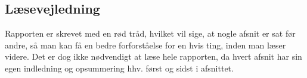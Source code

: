 \subsection{Læsevejledning}
Rapporten er skrevet med en rød tråd, hvilket vil sige, at nogle afsnit er sat før andre, så man kan få en bedre forforståelse for en hvis ting, inden man læser videre. Det er dog ikke nødvendigt at læse hele rapporten, da hvert afsnit har sin egen indledning og opsummering hhv. først og sidst i afsnittet.




